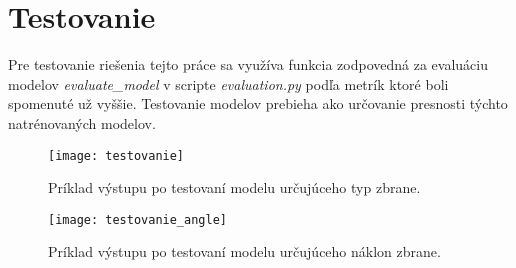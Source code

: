 
\section{Testovanie}
\label{sec:testovanie}
Pre testovanie riešenia tejto práce sa využíva funkcia zodpovedná za evaluáciu modelov \textit{evaluate\_model} v scripte \textit{evaluation.py}
    podľa metrík ktoré boli spomenuté už vyššie.
Testovanie modelov prebieha ako určovanie presnosti týchto natrénovaných modelov.

\begin{figure}[H]
    \centering
    \texttt{[image: testovanie]}
    \caption{Príklad výstupu po testovaní modelu určujúceho typ zbrane.}
    \label{pic:testovanie}
\end{figure}

\begin{figure}[H]
    \centering
    \texttt{[image: testovanie\_angle]}
    \caption{Príklad výstupu po testovaní modelu určujúceho náklon zbrane.}
    \label{pic:testovanie}
\end{figure}
